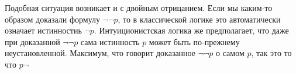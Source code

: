 Подобная ситуация возникает и с двойным отрицанием. Если мы каким-то образом доказали формулу $\neg\neg p$, то в классической логике это автоматически означает истинностиь $\neg p$. Интуиционистская логика же предполагает, что даже при доказанной $\neg\neg p$ сама истинность $p$ может быть по-прежнему неустановленной. Максимум, что говорит доказанное $\neg\neg p$ о самом $p$, так это то что $p\neg$
